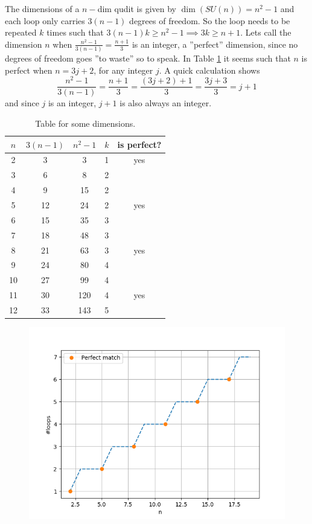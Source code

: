 The dimensions of a $n-$dim qudit is given by $\dim(SU(n)) = n^2 -1$ and each loop only carries $3(n-1)$ degrees of freedom. So the loop needs to be repeated $k$ times such that $3(n-1)k \geq n^2 -1 \implies 3k \geq n + 1$.
Lets call the dimension $n$ when $\frac{n^2-1}{3(n-1)} = \frac{n+1}{3}$ is an integer, a ''perfect'' dimension, since no degrees of freedom goes ''to waste'' so to speak. In Table \ref{tab:dim} it seems such that $n$ is perfect when $n = 3j + 2$, for any integer $j$.
A quick calculation shows
\begin{equation}
\frac{n^2 -1}{3(n-1)} = \frac{n + 1}{3} = \frac{(3j+2) + 1}{3} = \frac{3j+3}{3} = j + 1 
\end{equation}
and since $j$ is an integer, $j + 1$ is also always an integer.\\
\begin{table}[H]
\centering 
\begin{tabular}{|c|c|c|c|c|}
\hline
$n$ & $3(n-1)$ & $n^2 - 1$ & $k$ & is perfect?\\
\hline
2& 3& 3& 1& yes\\
3& 6& 8& 2& \\
4& 9& 15& 2& \\
5& 12& 24& 2& yes \\
6& 15& 35& 3& \\
7& 18& 48& 3& \\
8& 21& 63& 3& yes \\
9& 24& 80& 4& \\
10& 27& 99& 4& \\
11& 30& 120& 4& yes \\
12& 33& 143& 5& \\
\hline
\end{tabular}
\caption{Table for some dimensions.}
\label{tab:dim}
\end{table}

\begin{figure}[H]
\centering
\includegraphics[scale=0.6]{figures/perfect_dim.png}
\end{figure}

